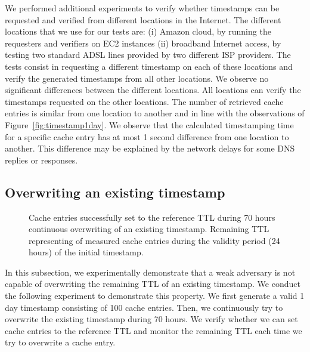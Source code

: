 We performed additional experiments to verify whether timestamps can be requested and verified from different locations in the Internet. The different locations that we use for our tests are: (i) Amazon cloud, by running the requesters and verifiers on EC2 instances (ii) broadband Internet access, by testing two standard ADSL lines provided by two different ISP providers.
The tests consist in requesting a different timestamp on each of these locations and verify the generated timestamps from all other locations. We observe no significant differences between the different locations. All locations can verify the timestamps requested on the other locations. The number of retrieved cache entries is similar from one location to another and in line with the observations of Figure~\ref{fig:timestamp1day}.
We observe that the calculated timestamping time for a specific cache entry has at most 1 second difference from one location to another. This difference may be explained by the network delays for some DNS replies or responses. 




\subsection{Overwriting an existing timestamp}
\label{sec:overwrite}

\begin{figure*}
\begin{center}
\caption{  Cache entries successfully set to the reference TTL during 70 hours continuous overwriting of an existing timestamp.  Remaining TTL representing  of measured cache entries during the validity period (24 hours) of the initial timestamp. }
\end{center}
\end{figure*}

In this subsection, we experimentally demonstrate that a weak adversary is not capable of overwriting the remaining TTL of an existing timestamp.
We conduct the following experiment to demonstrate this property. We first generate a valid 1 day timestamp consisting of 100 cache entries. Then, we continuously try to overwrite the existing timestamp during 70 hours. We verify whether we can set cache entries to the reference TTL and monitor the remaining TTL each time we try to overwrite a cache entry.

